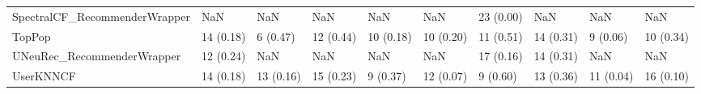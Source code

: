\begin{tabular}{llllllllll}
      SpectralCF\_RecommenderWrapper &                      NaN &         NaN &           NaN &          NaN &                  NaN &           23 (0.00) &               NaN &                NaN &               NaN \\
                             TopPop &                14 (0.18) &    6 (0.47) &     12 (0.44) &    10 (0.18) &            10 (0.20) &           11 (0.51) &         14 (0.31) &           9 (0.06) &         10 (0.34) \\
         UNeuRec\_RecommenderWrapper &                12 (0.24) &         NaN &           NaN &          NaN &                  NaN &           17 (0.16) &         14 (0.31) &                NaN &               NaN \\
                          UserKNNCF &                14 (0.18) &   13 (0.16) &     15 (0.23) &     9 (0.37) &            12 (0.07) &            9 (0.60) &         13 (0.36) &          11 (0.04) &         16 (0.10) \\
\bottomrule
\end{tabular}
